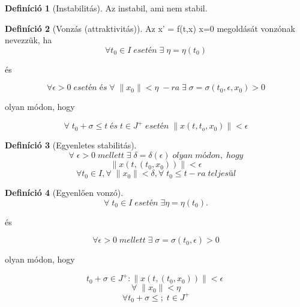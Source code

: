 \documentclass{article}
\theoremstyle{definition}
\theoremstyle{theorem}
\newtheorem{definition}{Definíció}
\begin{document}
\begin{definition}[Instabilitás]
Az instabil, ami nem stabil.
\end{definition}

\begin{definition}[Vonzás (attraktivitás)]
Az x' = f(t,x) x=0 megoldását vonzónak nevezzük, ha
\begin{equation*}
    \forall t_0 \in I \; esetén\; \exists\; \eta = \eta(t_0)
\end{equation*}
\begin{center}
    és
\end{center}
\begin{equation*}
    \forall \epsilon > 0\; esetén \;és\; \forall \; \lVert x_0 \rVert < \eta \;-ra \; \exists \; \sigma = \sigma(t_0,\epsilon,x_0) > 0
\end{equation*}
\begin{center}
    olyan módon, hogy
\end{center}
\begin{equation*}
    \forall \; t_0 + \sigma \leq t \;és\; t \in J^+ \;esetén \; \lVert x(t,t_o,x_0) \rVert < \epsilon
\end{equation*}
\end{definition}
\begin{definition}[Egyenletes stabilitás]
\begin{equation*}
    \forall \; \epsilon > 0 \; mellett \; \exists \; \delta  = \delta(\epsilon) \;olyan \;módon,\;hogy
\end{equation*}
\begin{equation*}
    \lVert x(t,(t_0,x_0)) \rVert < \epsilon
\end{equation*}
\begin{equation*}
    \forall t_0 \in I, \forall \; \lVert x_0 \rVert < \delta,
    \forall \; t_0 \leq t-ra \;teljesül
\end{equation*}
\end{definition}

\begin{definition}[Egyenlően vonzó]
\begin{equation*}
    \forall \; t_0 \in I \; esetén \; \exists \eta = \eta(t_0).
\end{equation*}
\begin{center}
    és
\end{center}
\begin{equation*}
    \forall \epsilon > 0 \; mellett \; \exists \; \sigma = \sigma(t_0,\epsilon) > 0
\end{equation*}
\begin{center}
    olyan módon, hogy
\end{center}
\begin{equation*}
    t_0 + \sigma \in J^+ : \lVert x(t,(t_0,x_0)) \rVert < \epsilon
    \;
\end{equation*}
\begin{equation*}
     \forall \; \lVert x_0 \rVert < \eta
\end{equation*}
\begin{equation*}
     \forall t_0 + \sigma \leq ; \; t \in J^+
\end{equation*}
\end{definition}
\end{document}
